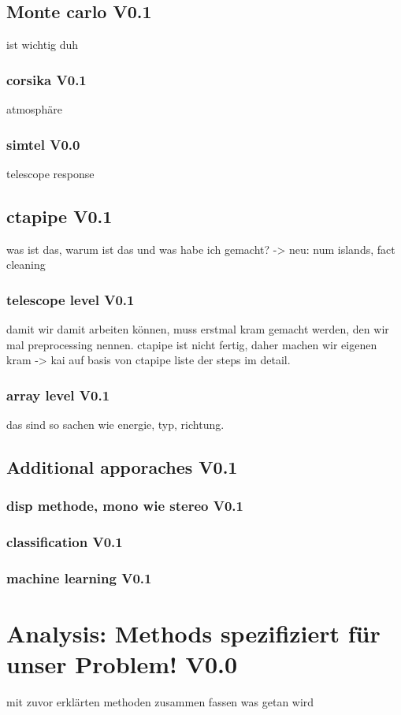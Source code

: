 \section{Monte carlo V0.1}
ist wichtig duh
\subsection{corsika V0.1}
atmosphäre
\subsection{simtel V0.0}
telescope response
\section{ctapipe V0.1}
was ist das, warum ist das und was habe ich gemacht?
-> neu: num islands, fact cleaning
\subsection{telescope level  V0.1}
damit wir damit arbeiten können, muss erstmal kram gemacht werden, den
wir mal preprocessing nennen.
ctapipe ist nicht fertig, daher machen wir eigenen kram -> kai auf basis von ctapipe
liste der steps im detail.
\subsection{array level V0.1}
das sind so sachen wie energie, typ, richtung.
\section{Additional apporaches V0.1}
\subsection{disp methode, mono wie stereo V0.1}
\subsection{classification V0.1}
\subsection{machine learning V0.1}


\chapter{Analysis: Methods spezifiziert für unser Problem! V0.0}
mit zuvor erklärten methoden zusammen fassen was getan wird
